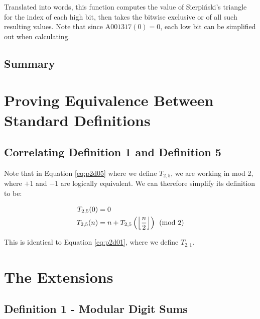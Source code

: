\documentclass[conference]{IEEEtran}
\begin{document}
Translated into words, this function computes the value of Sierpiński's triangle for the index of each high bit, then takes the bitwise exclusive or of all such resulting values. Note that since $\text{A001317}(0) = 0$, each low bit can be simplified out when calculating.


\subsection{Summary}

\section{Proving Equivalence Between Standard Definitions}

\subsection{Correlating Definition 1 and Definition 5}

Note that in Equation \ref{eq:p2d05} where we define $T_{2,5}$, we are working in mod 2, where $+1$ and $-1$ are logically equivalent. We can therefore simplify its definition to be:

\begin{equation}
    \label{eq:p2d05s}
    \begin{aligned}
T_{2,5}(0) &= 0 \\
T_{2,5}(n) &= n + T_{2,5}\left(\floor{\dfrac{n}{2}}\right) \pmod{2}
    \end{aligned}
\end{equation}

This is identical to Equation \ref{eq:p2d01}, where we define $T_{2,1}$.

\section{The Extensions}

\subsection{Definition 1 - Modular Digit Sums}

\end{document}
